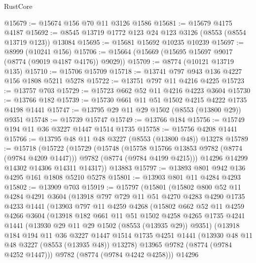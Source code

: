 \begin{lexlean}{RustCore}
\begin{coremodule}
@15679 := @15674 @156 @70 @11 @3126 @1586
@15681 := @15679 @4175 @4187
@15692 := @8545 @13719 @1772 @123 @24 @123 @3126 (@8553 (@8554 @13719 @123)) @13084
@15695 := @15681 @15692 @10235 @10239
@15697 := @8999 (@10241 @156)
@15706 := @15664 (@15669 (@15695 @15697 @9017 (@8774 (@9019 @4187 @4176)) @9029))
@15709 := @8774 (@10121 @13719 @135)
@15710 := @15706 @15709
@15718 := @13741 @797 @943 @136 @4227 @156 @1808 @5211 @5278
@15722 := @13751 @797 @11 @4216 @4225
@15723 := @13757 @703
@15729 := @15723 @662 @52 @11 @4216 @4223 @3604
@15730 := @13766 @182
@15739 := @15730 @661 @11 @51 @1502 @4215 @4222 @1735 @4198 @1441
@15747 := @13795 @29 @11 @29 @1502 (@8553 (@13800 @29)) @9351
@15748 := @15739 @15747
@15749 := @13766 @184
@15756 := @15749 @194 @11 @36 @3227 @1447 @1514 @1735
@15758 := @15756 @4208 @1441
@15766 := @13795 @48 @11 @48 @3227 (@8553 (@13800 @48)) @13278
@15789 := @15718
    (@15722
      (@15729
        (@15748
          (@15758 @15766 @13853 @9782 (@8774 (@9784 @4209 @1447)))
          @9782
          (@8774 (@9784 @4199 @4215)))
        @14296
        @14299
        @14302
        @14306
        @14311
        @14317))
    @13883
@15797 := @13893 @801 @942 @136 @4295 @161 @1808 @5210 @5278
@15801 := @13903 @801 @11 @4284 @4293
@15802 := @13909 @703
@15919 := @15797
    (@15801
      (@15802
        @800
        @52
        @11
        @4284
        @4291
        @3604
        (@13918
          @797
          @729
          @11
          @51
          @4270
          @4283
          @4290
          @1735
          @4233
          @1441
          (@13903
            @797
            @11
            @4259
            @4268
            (@15802
              @662
              @52
              @11
              @4259
              @4266
              @3604
              (@13918
                @182
                @661
                @11
                @51
                @1502
                @4258
                @4265
                @1735
                @4241
                @1441
                (@13930 @29 @11 @29 @1502 (@8553 (@13935 @29)) @9351)
                (@13918
                  @184
                  @194
                  @11
                  @36
                  @3227
                  @1447
                  @1514
                  @1735
                  @4251
                  @1441
                  (@13930 @48 @11 @48 @3227 (@8553 (@13935 @48)) @13278)
                  @13965
                  @9782
                  (@8774 (@9784 @4252 @1447)))
                @9782
                (@8774 (@9784 @4242 @4258)))
              @14296

\end{coremodule}
\end{lexlean}
